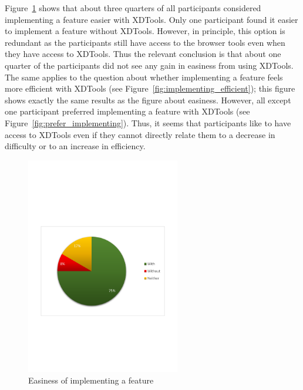 Figure~\ref{fig:implementing_easier} shows that about three quarters of all participants considered implementing a feature easier with XDTools. Only one participant found it easier to implement a feature without XDTools. However, in principle, this option is redundant as the participants still have access to the browser tools even when they have access to XDTools. Thus the relevant conclusion is that about one quarter of the participants did not see any gain in easiness from using XDTools. The same applies to the question about whether implementing a feature feels more efficient with XDTools (see Figure~\ref{fig:implementing_efficient}); this figure shows exactly the same results as the figure about easiness. However, all except one participant preferred implementing a feature with XDTools (see Figure~\ref{fig:prefer_implementing}). Thus, it seems that participants like to have access to XDTools even if they cannot directly relate them to a decrease in difficulty or to an increase in efficiency.
\begin{figure}[H]
  \centering
    \includegraphics[width=0.6\textwidth]{images/charts/implementing_easier.pdf}
	\caption[Easiness of implementing]{Easiness of implementing a feature}
	\label{fig:implementing_easier}
\end{figure}

